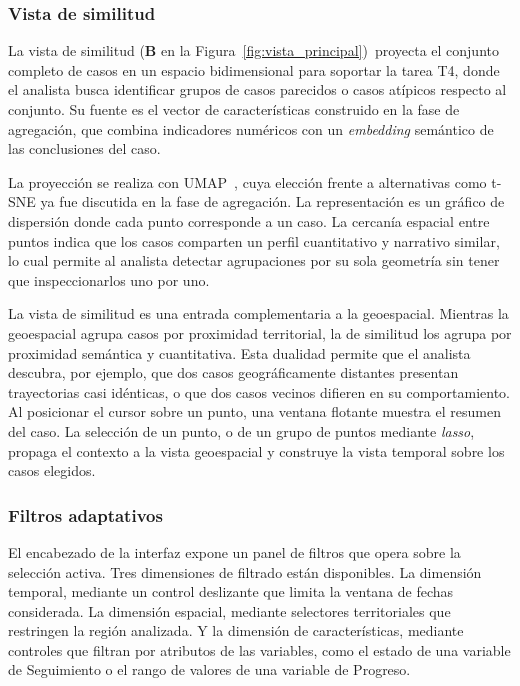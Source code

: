 \subsubsection{Vista de similitud}

La vista de similitud (\textbf{B} en la 
Figura~\ref{fig:vista_principal})~proyecta el conjunto 
completo de casos en un espacio bidimensional para 
soportar la tarea T4, donde el analista busca identificar 
grupos de casos parecidos o casos atípicos respecto al 
conjunto. Su fuente es el vector de características 
construido en la fase de agregación, que combina 
indicadores numéricos con un \textit{embedding} semántico 
de las conclusiones del caso.

La proyección se realiza con \acs{UMAP}~\cite{mcinnes2018umap}, 
cuya elección frente a alternativas como t-SNE ya fue 
discutida en la fase de agregación. La representación es 
un gráfico de dispersión donde cada punto corresponde a 
un caso. La cercanía espacial entre puntos indica que los 
casos comparten un perfil cuantitativo y narrativo 
similar, lo cual permite al analista detectar agrupaciones 
por su sola geometría sin tener que inspeccionarlos uno 
por uno.

La vista de similitud es una entrada complementaria a la 
geoespacial. Mientras la geoespacial agrupa casos por 
proximidad territorial, la de similitud los agrupa por 
proximidad semántica y cuantitativa. Esta dualidad permite 
que el analista descubra, por ejemplo, que dos casos 
geográficamente distantes presentan trayectorias casi 
idénticas, o que dos casos vecinos difieren en su 
comportamiento. Al posicionar el cursor sobre un punto, 
una ventana flotante muestra el resumen del caso. La 
selección de un punto, o de un grupo de puntos mediante 
\textit{lasso}, propaga el contexto a la vista 
geoespacial y construye la vista temporal sobre los casos 
elegidos.

\subsubsection{Filtros adaptativos}

El encabezado de la interfaz expone un panel de filtros 
que opera sobre la selección activa. Tres dimensiones de 
filtrado están disponibles. La dimensión temporal, 
mediante un control deslizante que limita la ventana de 
fechas considerada. La dimensión espacial, mediante 
selectores territoriales que restringen la región 
analizada. Y la dimensión de características, mediante 
controles que filtran por atributos de las variables, 
como el estado de una variable de Seguimiento o el rango 
de valores de una variable de Progreso.

